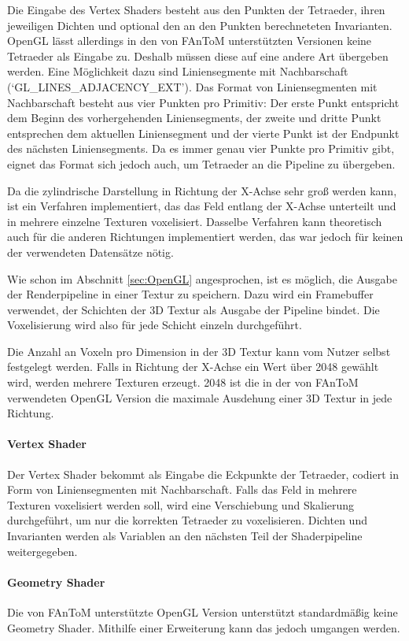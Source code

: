 \documentclass[a4paper,fontsize=12pt,toc=bib,halfparskip]{scrartcl}
\begin{document}
Die Eingabe des Vertex Shaders besteht aus den Punkten der Tetraeder, ihren jeweiligen Dichten und optional den an den Punkten berechneteten Invarianten. OpenGL l\"asst allerdings in den von FAnToM unterst\"utzten Versionen keine Tetraeder als Eingabe zu. Deshalb m\"ussen diese auf eine andere Art \"ubergeben werden. Eine M\"oglichkeit dazu sind Liniensegmente mit Nachbarschaft (`GL\_LINES\_ADJACENCY\_EXT'). Das Format von Liniensegmenten mit Nachbarschaft besteht aus vier Punkten pro Primitiv: Der erste Punkt entspricht dem Beginn des vorhergehenden Liniensegments, der zweite und dritte Punkt entsprechen dem aktuellen Liniensegment und der vierte Punkt ist der Endpunkt des n\"achsten Liniensegments. Da es immer genau vier Punkte pro Primitiv gibt, eignet das Format sich jedoch auch, um Tetraeder an die Pipeline zu \"ubergeben.

Da die zylindrische Darstellung in Richtung der X-Achse sehr gro{\ss} werden kann, ist ein Verfahren implementiert, das das Feld entlang der X-Achse unterteilt und in mehrere einzelne Texturen voxelisiert. Dasselbe Verfahren kann theoretisch auch f\"ur die anderen Richtungen implementiert werden, das war jedoch f\"ur keinen der verwendeten Datens\"atze n\"otig.

Wie schon im Abschnitt \ref{sec:OpenGL} angesprochen, ist es m\"oglich, die Ausgabe der Renderpipeline in einer Textur zu speichern. Dazu wird ein Framebuffer verwendet, der Schichten der 3D Textur als Ausgabe der Pipeline bindet. Die Voxelisierung wird also f\"ur jede Schicht einzeln durchgef\"uhrt.

Die Anzahl an Voxeln pro Dimension in der 3D Textur kann vom Nutzer selbst festgelegt werden. Falls in Richtung der X-Achse ein Wert \"uber 2048 gew\"ahlt wird, werden mehrere Texturen erzeugt. 2048 ist die in der von FAnToM verwendeten OpenGL Version die maximale Ausdehung einer 3D Textur in jede Richtung.

\paragraph{Vertex Shader}
Der Vertex Shader bekommt als Eingabe die Eckpunkte der Tetraeder, codiert in Form von Liniensegmenten mit Nachbarschaft. Falls das Feld in mehrere Texturen voxelisiert werden soll, wird eine Verschiebung und Skalierung durchgef\"uhrt, um nur die korrekten Tetraeder zu voxelisieren. Dichten und Invarianten werden als Variablen an den n\"achsten Teil der Shaderpipeline weitergegeben.

\paragraph{Geometry Shader}
Die von FAnToM unterst\"utzte OpenGL Version unterst\"utzt standardm\"a{\ss}ig keine Geometry Shader. Mithilfe einer Erweiterung kann das jedoch umgangen werden.
\end{document}
